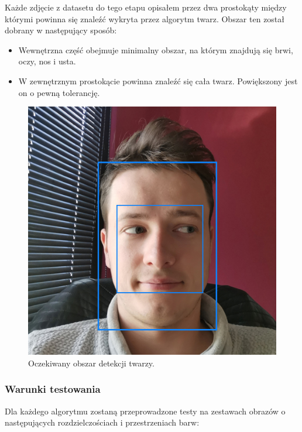 Każde zdjęcie z datasetu do tego etapu opisałem przez dwa prostokąty między którymi powinna się znaleźć wykryta przez algorytm twarz. Obszar ten został dobrany w następujący sposób:

\begin{itemize}
    \item Wewnętrzna część obejmuje minimalny obszar, na którym znajdują się brwi, oczy, nos i usta.
    \item W zewnętrznym prostokącie powinna znaleźć się cała twarz. Powiększony jest on o pewną tolerancję. 
\end{itemize}

\begin{figure}[!h]
    \begin{center}
        \includegraphics[scale=0.3]{img/face_section/face_test_expected.jpg}
        \caption{Oczekiwany obszar detekcji twarzy. }
        \label{fig:face_test_expected}
    \end{center}
\end{figure}

\subsubsection{Warunki testowania}

Dla każdego algorytmu zostaną przeprowadzone testy na zestawach obrazów o następujących rozdzielczościach i przestrzeniach barw:

